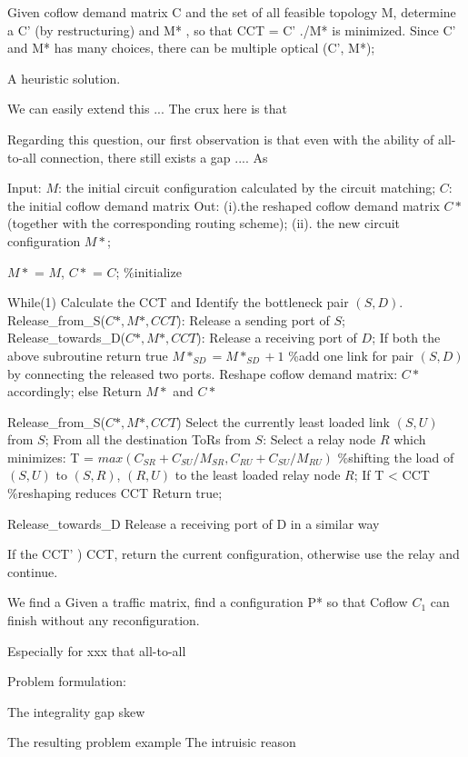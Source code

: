 {Given coflow demand matrix C and the set of all feasible topology {M}, determine a C’ (by restructuring) and M* ,
   so that  CCT = C’ ./M* is minimized.
Since C’ and M* has many choices, there can be multiple optical (C’, M*);

A heuristic solution.


We can easily extend this ...
The crux here is that




Regarding this question, our first observation is that even with the ability of all-to-all connection, there still exists a gap ....
As

Input: $M$: the initial circuit configuration  calculated by the circuit matching;
$C$: the initial coflow demand matrix
Out: (i).the reshaped coflow demand matrix $C*$ (together with the corresponding routing scheme);  (ii). the new circuit configuration $M*$;

$M*$ = $M$, $C*$ = $C$;  \%initialize

While(1)
Calculate the CCT and Identify the bottleneck pair $(S, D)$.
Release_from_S($C*,M*,CCT$): Release a sending port of $S$;
Release_towards_D($C*,M*,CCT$): Release a receiving port of $D$;
If both the above subroutine return true
$M*_{SD} = M*_{SD}+1$ \%add one link for pair  $(S, D)$ by connecting the released two ports.
Reshape coflow demand matrix: $C*$ accordingly;
else
Return $M*$ and $C*$



Release_from_S($C*,M*,CCT$)
Select the currently least loaded link $(S,U)$ from $S$;
From all the destination ToRs from $S$:
Select a relay node $R$ which minimizes: T = $max(C_{SR}+C_{SU}/M_{SR}, C_{RU}+C_{SU}/M_{RU})$
\%shifting the load of $(S,U)$  to $(S,R)$, $(R,U)$  to the least loaded relay node $R$;
If T < CCT  \%reshaping reduces CCT
Return true;

Release_towards_D
Release a receiving port of D in a similar way

If the CCT’ ) CCT, return the current configuration, otherwise use the relay and continue.

We find a
Given a traffic matrix, find a configuration P* so that Coflow $C_1$ can finish without any reconfiguration.

Especially for xxx that all-to-all


Problem formulation:

The integrality gap
skew

The resulting problem example
The intruisic reason

}
